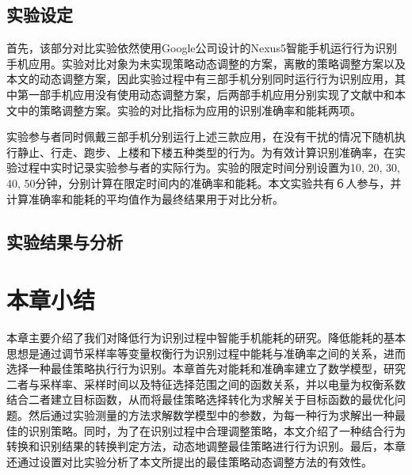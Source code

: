 \subsection{实验设定}
\par 首先，该部分对比实验依然使用Google公司设计的Nexus5智能手机运行行为识别手机应用。实验对比对象为未实现策略动态调整的方案，离散的策略调整方案以及本文的动态调整方案，因此实验过程中有三部手机分别同时运行行为识别应用，其中第一部手机应用没有使用动态调整方案，后两部手机应用分别实现了文献\cite{}中和本文中的策略调整方案。实验的对比指标为应用的识别准确率和能耗两项。
\par 实验参与者同时佩戴三部手机分别运行上述三款应用，在没有干扰的情况下随机执行静止、行走、跑步、上楼和下楼五种类型的行为。为有效计算识别准确率，在实验过程中实时记录实验参与者的实际行为。实验的限定时间分别设置为10, 20, 30, 40, 50分钟，分别计算在限定时间内的准确率和能耗。本文实验共有６人参与，并计算准确率和能耗的平均值作为最终结果用于对比分析。
\subsection{实验结果与分析}
\section{本章小结}
\par 本章主要介绍了我们对降低行为识别过程中智能手机能耗的研究。降低能耗的基本思想是通过调节采样率等变量权衡行为识别过程中能耗与准确率之间的关系，进而选择一种最佳策略执行行为识别。本章首先对能耗和准确率建立了数学模型，研究二者与采样率、采样时间以及特征选择范围之间的函数关系，并以电量为权衡系数结合二者建立目标函数，从而将最佳策略选择转化为求解关于目标函数的最优化问题。然后通过实验测量的方法求解数学模型中的参数，为每一种行为求解出一种最佳的识别策略。同时，为了在识别过程中合理调整策略，本文介绍了一种结合行为转换和识别结果的转换判定方法，动态地调整最佳策略进行行为识别。最后，本章还通过设置对比实验分析了本文所提出的最佳策略动态调整方法的有效性。